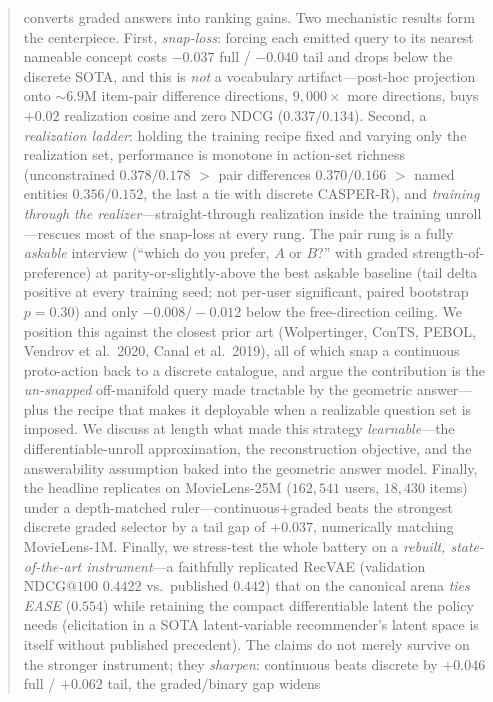 \documentclass[11pt]{article}
\begin{document}
\begin{abstract}
converts graded answers into ranking gains. Two mechanistic results form the centerpiece. First, \emph{snap-loss}: forcing each
emitted query to its nearest nameable concept costs $-0.037$ full / $-0.040$ tail and drops below the discrete SOTA,
and this is \emph{not} a vocabulary artifact---post-hoc projection onto ${\sim}6.9$M item-pair difference directions,
$9{,}000\times$ more directions, buys $+0.02$ realization cosine and zero NDCG ($0.337/0.134$). Second, a
\emph{realization ladder}: holding the training recipe fixed and varying only the realization set, performance is
monotone in action-set richness (unconstrained $0.378/0.178$ $>$ pair differences $0.370/0.166$ $>$ named entities
$0.356/0.152$, the last a tie with discrete CASPER-R), and \emph{training through the realizer}---straight-through
realization inside the training unroll---rescues most of the snap-loss at every rung. The pair rung is a fully
\emph{askable} interview (``which do you prefer, $A$ or $B$?'' with graded strength-of-preference) at
parity-or-slightly-above the best askable baseline (tail delta positive at every training seed; not per-user
significant, paired bootstrap $p{=}0.30$) and only $-0.008/-0.012$ below the free-direction ceiling. We position this
against the closest prior art (Wolpertinger, ConTS, PEBOL, Vendrov et al.\ 2020, Canal et al.\ 2019), all of which snap
a continuous proto-action back to a discrete catalogue, and argue the contribution is the \emph{un-snapped} off-manifold
query made tractable by the geometric answer---plus the recipe that makes it deployable when a realizable question set
is imposed. We discuss at length what made this strategy \emph{learnable}---the differentiable-unroll approximation,
the reconstruction objective, and the answerability assumption baked into the geometric answer model.
Finally, the headline replicates on MovieLens-25M ($162{,}541$ users, $18{,}430$ items) under a depth-matched
ruler---continuous$+$graded beats the strongest discrete graded selector by a tail gap of $+0.037$, numerically
matching MovieLens-1M.
Finally, we stress-test the whole battery on a \emph{rebuilt, state-of-the-art instrument}---a faithfully replicated
RecVAE (validation $\mathrm{NDCG@100}$ $0.4422$ vs.\ published $0.442$) that on the canonical arena \emph{ties EASE}
($0.554$) while retaining the compact differentiable latent the policy needs (elicitation in a SOTA latent-variable
recommender's latent space is itself without published precedent). The claims do not merely survive on the stronger
instrument; they \emph{sharpen}: continuous beats discrete by $+0.046$ full / $+0.062$ tail, the graded/binary gap widens

\end{abstract}
\end{document}
